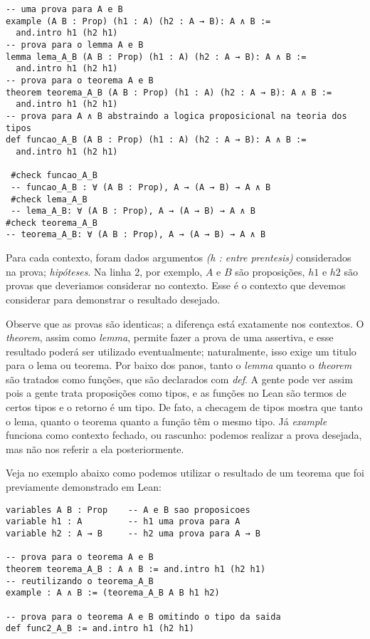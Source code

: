 \vspace{5mm}
\begin{lstlisting}
-- uma prova para A e B
example (A B : Prop) (h1 : A) (h2 : A → B): A ∧ B :=
  and.intro h1 (h2 h1)
-- prova para o lemma A e B
lemma lema_A_B (A B : Prop) (h1 : A) (h2 : A → B): A ∧ B :=
  and.intro h1 (h2 h1)
-- prova para o teorema A e B
theorem teorema_A_B (A B : Prop) (h1 : A) (h2 : A → B): A ∧ B :=
  and.intro h1 (h2 h1)
-- prova para A ∧ B abstraindo a logica proposicional na teoria dos tipos
def funcao_A_B (A B : Prop) (h1 : A) (h2 : A → B): A ∧ B :=
  and.intro h1 (h2 h1)
 
 #check funcao_A_B 
 -- funcao_A_B : ∀ (A B : Prop), A → (A → B) → A ∧ B
 #check lema_A_B 
 -- lema_A_B: ∀ (A B : Prop), A → (A → B) → A ∧ B
#check teorema_A_B 
-- teorema_A_B: ∀ (A B : Prop), A → (A → B) → A ∧ B
\end{lstlisting}
\vspace{5mm}

\noindent Para cada contexto, foram dados argumentos \textit{(h : entre prentesis)} considerados na prova; \textit{hipóteses}. Na linha 2, por exemplo, $A$ e $B$ são proposições, $h1$ e $h2$ são provas que deveriamos considerar no contexto. Esse é o contexto que devemos considerar para demonstrar o resultado desejado.

Observe que as provas são identicas; a diferença está exatamente nos contextos. O \textit{theorem}, assim como \textit{lemma}, permite fazer a prova de uma assertiva, e esse resultado poderá ser utilizado eventualmente; naturalmente, isso exige um titulo para o lema ou teorema. 
Por baixo dos panos, tanto o \textit{lemma} quanto o \textit{theorem} são tratados como funções, que são declarados com \textit{def}. A gente pode ver assim pois a gente trata proposições como tipos, e as funções no Lean são termos de certos tipos e o retorno é um tipo. De fato, a checagem de tipos mostra que tanto o lema, quanto o teorema quanto a função têm o mesmo tipo.
Já \textit{example} funciona como contexto fechado, ou rascunho: podemos realizar a prova desejada, mas não nos referir a ela posteriormente.

Veja no exemplo abaixo como podemos utilizar o resultado de um teorema que foi previamente demonstrado em Lean:
\pagebreak
\vspace{5mm}
\begin{lstlisting}
variables A B : Prop    -- A e B sao proposicoes
variable h1 : A         -- h1 uma prova para A
variable h2 : A → B     -- h2 uma prova para A → B

-- prova para o teorema A e B
theorem teorema_A_B : A ∧ B := and.intro h1 (h2 h1)
-- reutilizando o teorema_A_B
example : A ∧ B := (teorema_A_B A B h1 h2)

-- prova para o teorema A e B omitindo o tipo da saida
def func2_A_B := and.intro h1 (h2 h1)

\end{lstlisting}
\vspace{5mm}

